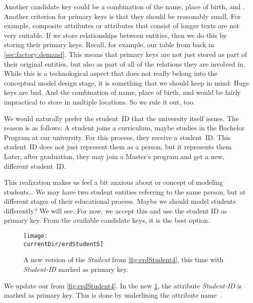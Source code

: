 Another candidate key could be a combination of the name, place of birth, and .
Another criterion for primary keys is that they should be reasonably small.
For example, composite attributes or attributes that consist of longer texts are not very suitable.
If we store relationships between entities, then we do this by storing their primary keys.
Recall, for example, our  table from back in \cref{sec:factory:demand}.
This means that primary keys are not just stored as part of their original entities, but also as part of all of the relations they are involved in.
While this is a technological aspect that does not really belong into the conceptual model design stage, it is something that we should keep in mind:
Huge keys are bad.
And the combination of name, place of birth, and  would be fairly impractical to store in multiple locations.
So we rule it out, too.

We would naturally prefer the student~ID that the university itself issues.
The reason is as follows:
A student joins a curriculum, maybe studies in the Bachelor Program  at our university.
For this process, they receive a student~ID.
This student~ID does not just represent them as a person, but it represents them 
Later, after graduation, they may join a Master's program and get a new, different student~ID.

This realization makes us feel a bit anxious about or concept of modeling students{\dots}
We may have two student entities referring to the same person, but at different stages of their educational process.
Maybe we should model students differently?
We will see.
For now, we accept this and use the student ID as primary key.
From the available candidate keys, it is the best option.

\begin{figure}%
%
\centering%
\texttt{[image: \\currentDir/erdStudent5]}%
\caption{A new version of the \emph{Student}  from \cref{fig:erdStudent4}, this time with \emph{Student-ID} marked as primary key.}%
\label{fig:erdStudent5}%
\end{figure}%
%
We update our  from \cref{fig:erdStudent4}.
In the new \cref{fig:erdStudent5}, the attribute \emph{Student-ID} is marked as primary key.
This is done by underlining the attribute name~\cite{G2011EW2ITDS:CMUTERM}.


